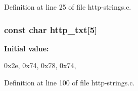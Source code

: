 Definition at line 25 of file http-\/strings.c.

\hypertarget{http-strings_8c_a4f366bfe5aadc430314df6368294c385}{
\subsubsection[{http\_\-txt}]{\setlength{\rightskip}{0pt plus 5cm}const char {\bf http\_\-txt}\mbox{[}5\mbox{]}}}
\label{http-strings_8c_a4f366bfe5aadc430314df6368294c385}
{\bfseries Initial value:}
\begin{DoxyCode}
 

{0x2e, 0x74, 0x78, 0x74, }
\end{DoxyCode}


Definition at line 100 of file http-\/strings.c.

